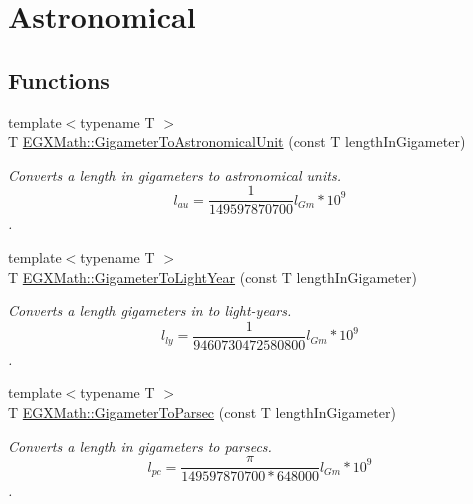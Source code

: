 \hypertarget{group___e_g_x_math-_conversions-_length_conversions-_s_i-_gigameter-_astronomical}{}\section{Astronomical}
\label{group___e_g_x_math-_conversions-_length_conversions-_s_i-_gigameter-_astronomical}
\subsection*{Functions}
\begin{DoxyCompactItemize}
\item 
{\footnotesize template$<$typename T $>$ }\\T \mbox{\hyperlink{group___e_g_x_math-_conversions-_length_conversions-_s_i-_gigameter-_astronomical_ga048b5af6ec2f33e28435823ffa238d17}{E\+G\+X\+Math\+::\+Gigameter\+To\+Astronomical\+Unit}} (const T length\+In\+Gigameter)
\begin{DoxyCompactList}\small\item\em Converts a length in gigameters to astronomical units. \[ l_{au}= \frac{1}{149597870700} l_{Gm} * 10^{9} \]. \end{DoxyCompactList}\item 
{\footnotesize template$<$typename T $>$ }\\T \mbox{\hyperlink{group___e_g_x_math-_conversions-_length_conversions-_s_i-_gigameter-_astronomical_ga352bdc453f4bccc2dd188f009c02ff62}{E\+G\+X\+Math\+::\+Gigameter\+To\+Light\+Year}} (const T length\+In\+Gigameter)
\begin{DoxyCompactList}\small\item\em Converts a length gigameters in to light-\/years. \[ l_{ly}= \frac{1}{9460730472580800} l_{Gm} * 10^{9} \]. \end{DoxyCompactList}\item 
{\footnotesize template$<$typename T $>$ }\\T \mbox{\hyperlink{group___e_g_x_math-_conversions-_length_conversions-_s_i-_gigameter-_astronomical_ga5a83442adf1a2b81447b7355527f5ec4}{E\+G\+X\+Math\+::\+Gigameter\+To\+Parsec}} (const T length\+In\+Gigameter)
\begin{DoxyCompactList}\small\item\em Converts a length in gigameters to parsecs. \[ l_{pc}=\frac{\pi}{149597870700 * 648000} l_{Gm} * 10^{9} \]. \end{DoxyCompactList}\end{DoxyCompactItemize}


